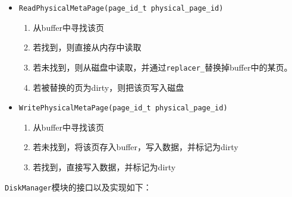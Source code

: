 \documentclass[12pt, a4paper]{article}
\def\c#1{\texttt{#1}}
\def\p{\par}
\begin{document}
\begin{itemize}
	\item \c{ReadPhysicalMetaPage(page\_id\_t physical\_page\_id)}\begin{enumerate}
		\item 从buffer中寻找该页
  \item 若找到，则直接从内存中读取
  \item 若未找到，则从磁盘中读取，并通过\c{replacer\_}替换掉buffer中的某页。
  \item 若被替换的页为dirty，则把该页写入磁盘
	\end{enumerate}
 \item \c{WritePhysicalMetaPage(page\_id\_t physical\_page\_id)}\begin{enumerate}
	 \item 从buffer中寻找该页
  \item 若未找到，将该页存入buffer，写入数据，并标记为dirty
  \item 若找到，直接写入数据，并标记为dirty
 \end{enumerate}
\end{itemize}
\p \c{DiskManager}模块的接口以及实现如下：
\end{document}

